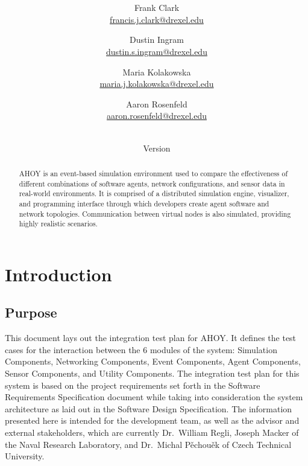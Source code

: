 \documentclass[titlepage]{article}
\title{\textbf{\mytitle}}
\author{
	Frank Clark \\\url{francis.j.clark@drexel.edu}
    \and Dustin Ingram \\\url{dustin.s.ingram@drexel.edu}
	\and Maria Kolakowska \\\url{maria.j.kolakowska@drexel.edu}
    \and Aaron Rosenfeld \\\url{aaron.rosenfeld@drexel.edu}
}
\date{\mydate\\Version \myversion}
\begin{document}

\begin{figure*}
    \centering
    \scalebox{0.8}{}
    \vspace{-4em}
\end{figure*}

\maketitle

\begin{abstract}
AHOY is an event-based simulation environment used to compare the effectiveness of different combinations of software agents, network configurations, and sensor data in real-world environments.  It is comprised of a distributed simulation engine, visualizer, and programming interface through which developers create agent software and network topologies.  Communication between virtual nodes is also simulated, providing highly realistic scenarios.
\end{abstract}

\setcounter{tocdepth}{4}
\tableofcontents
\label{toc}
\pagebreak
{}

\section{Introduction}
\label{sec:introduction}
\subsection{Purpose}
\label{sec:purpose}
This document lays out the integration test plan for AHOY. It defines the test cases for the interaction between the 6 modules of the system: Simulation Components, Networking Components, Event Components, Agent Components, Sensor Components, and Utility Components. The integration test plan for this system is based on the project requirements set forth in the Software Requirements Specification document while taking into consideration the system architecture as laid out in the Software Design Specification. The information presented here is intended for the development team, as well as the advisor and external stakeholders, which are currently Dr.~William Regli, Joseph Macker of the Naval Research Laboratory, and Dr.~Michal P\v{e}chou\v{e}k of Czech Technical University. 
\end{document}

